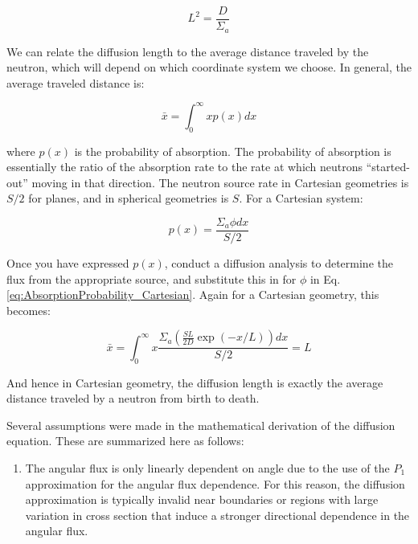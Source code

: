 \begin{equation}
\label{eq:DiffusionLength}
L^2=\frac{D}{\Sigma_a}
\end{equation}

We can relate the diffusion length to the average distance traveled by the neutron, which will depend on which coordinate system we choose. In general, the average traveled distance is:

\begin{equation}
\label{eq:AverageDistance}
\bar{x}=\int_{0}^{\infty}xp(x)dx
\end{equation}

where \(p(x)\) is the probability of absorption. The probability of absorption is essentially the ratio of the absorption rate to the rate at which neutrons ``started-out'' moving in that direction. The neutron source rate in Cartesian geometries is \(S/2\) for planes, and in spherical geometries is \(S\). For a Cartesian system:

\begin{equation}
\label{eq:AbsorptionProbability_Cartesian}
p(x)=\frac{\Sigma_a\phi dx}{S/2}
\end{equation}

Once you have expressed \(p(x)\), conduct a diffusion analysis to determine the flux from the appropriate source, and substitute this in for \(\phi\) in Eq. \ref{eq:AbsorptionProbability_Cartesian}. Again for a Cartesian geometry, this becomes:

\begin{equation}
\label{AverageDistance_Cartesian}
\bar{x}=\int_{0}^{\infty}x\frac{\Sigma_a\left(\frac{SL}{2D}\exp(-x/L)\right)dx}{S/2}=L
\end{equation}

And hence in Cartesian geometry, the diffusion length is exactly the average distance traveled by a neutron from birth to death.


Several assumptions were made in the mathematical derivation of the diffusion equation. These are summarized here as follows:

\begin{enumerate}
\item The angular flux is only linearly dependent on angle due to the use of the \(P_1\) approximation for the angular flux dependence. For this reason, the diffusion approximation is typically invalid near boundaries or regions with large variation in cross section that induce a stronger directional dependence in the angular flux.
\end{enumerate}

